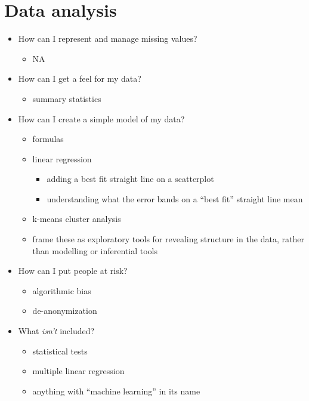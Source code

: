 \documentclass[]{Nemilov}
\providecommand{\tightlist}{%
  \setlength{\itemsep}{0pt}\setlength{\parskip}{0pt}}
\begin{document}
\hypertarget{data-analysis}{%
\section{Data analysis}\label{data-analysis}}

\begin{itemize}
\tightlist
\item
  How can I represent and manage missing values?

  \begin{itemize}
  \tightlist
  \item
    NA
  \end{itemize}
\item
  How can I get a feel for my data?

  \begin{itemize}
  \tightlist
  \item
    summary statistics
  \end{itemize}
\item
  How can I create a simple model of my data?

  \begin{itemize}
  \tightlist
  \item
    formulas
  \item
    linear regression

    \begin{itemize}
    \tightlist
    \item
      adding a best fit straight line on a scatterplot
    \item
      understanding what the error bands on a ``best fit'' straight line mean
    \end{itemize}
  \item
    k-means cluster analysis
  \item
    frame these as exploratory tools for revealing structure in the data, rather than modelling or inferential tools
  \end{itemize}
\item
  How can I put people at risk?

  \begin{itemize}
  \tightlist
  \item
    algorithmic bias
  \item
    de-anonymization
  \end{itemize}
\item
  What \emph{isn't} included?

  \begin{itemize}
  \tightlist
  \item
    statistical tests
  \item
    multiple linear regression
  \item
    anything with ``machine learning'' in its name
  \end{itemize}
\end{itemize}
\end{document}
